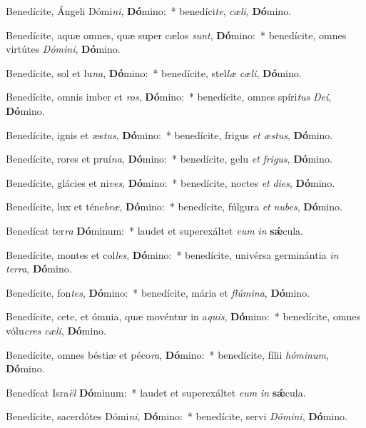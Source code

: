 \item Benedícite, Ángeli Dómi\textit{ni}, \textbf{Dó}mino:~* benedíci\textit{te}, \textit{cæ}\textit{li}, \textbf{Dó}mino.
\item Benedícite, aquæ omnes, quæ super cælos \textit{sunt}, \textbf{Dó}mino:~* benedícite, omnes virtútes \textit{Dó}\textit{mi}\textit{ni}, \textbf{Dó}mino.
\item Benedícite, sol et lu\textit{na}, \textbf{Dó}mino:~* benedícite, stel\textit{læ} \textit{cæ}\textit{li}, \textbf{Dó}mino.
\item Benedícite, omnis imber et \textit{ros}, \textbf{Dó}mino:~* benedícite, omnes spíri\textit{tus} \textit{De}\textit{i}, \textbf{Dó}mino.
\item Benedícite, ignis et æs\textit{tus}, \textbf{Dó}mino:~* benedícite, frigus \textit{et} \textit{æs}\textit{tus}, \textbf{Dó}mino.
\item Benedícite, rores et pruí\textit{na}, \textbf{Dó}mino:~* benedícite, gelu \textit{et} \textit{fri}\textit{gus}, \textbf{Dó}mino.
\item Benedícite, glácies et ni\textit{ves}, \textbf{Dó}mino:~* benedícite, noctes \textit{et} \textit{di}\textit{es}, \textbf{Dó}mino.
\item Benedícite, lux et téne\textit{bræ}, \textbf{Dó}mino:~* benedícite, fúlgura \textit{et} \textit{nu}\textit{bes}, \textbf{Dó}mino.
\item Benedícat ter\textit{ra} \textbf{Dó}minum:~* laudet et superexáltet \textit{e}\textit{um} \textit{in} \textbf{sǽ}cula.
\item Benedícite, montes et col\textit{les}, \textbf{Dó}mino:~* benedícite, univérsa germinántia \textit{in} \textit{ter}\textit{ra}, \textbf{Dó}mino.
\item Benedícite, fon\textit{tes}, \textbf{Dó}mino:~* benedícite, mária et \textit{flú}\textit{mi}\textit{na}, \textbf{Dó}mino.
\item Benedícite, cete, et ómnia, quæ movéntur in a\textit{quis}, \textbf{Dó}mino:~* benedícite, omnes vólu\textit{cres} \textit{cæ}\textit{li}, \textbf{Dó}mino.
\item Benedícite, omnes béstiæ et péco\textit{ra}, \textbf{Dó}mino:~* benedícite, fílii \textit{hó}\textit{mi}\textit{num}, \textbf{Dó}mino.
\item Benedícat Isra\textit{ël} \textbf{Dó}minum:~* laudet et superexáltet \textit{e}\textit{um} \textit{in} \textbf{sǽ}cula.
\item Benedícite, sacerdótes Dómi\textit{ni}, \textbf{Dó}mino:~* benedícite, servi \textit{Dó}\textit{mi}\textit{ni}, \textbf{Dó}mino.

